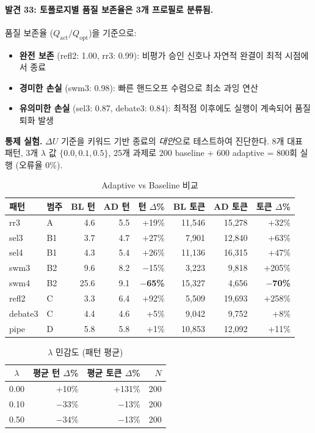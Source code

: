 \documentclass[a4paper,11pt]{article}
\begin{document}
\paragraph{발견 33: 토폴로지별 품질 보존율은 3개 프로필로 분류됨.}
품질 보존율 ($Q_{\text{act}}/Q_{\text{opt}}$)을 기준으로:
\begin{itemize}
  \item \textbf{완전 보존} (refl2: 1.00, rr3: 0.99): 비평가 승인 신호나 자연적 완결이 최적 시점에서 종료
  \item \textbf{경미한 손실} (swm3: 0.98): 빠른 핸드오프 수렴으로 최소 과잉 연산
  \item \textbf{유의미한 손실} (sel3: 0.87, debate3: 0.84): 최적점 이후에도 실행이 계속되어 품질 퇴화 발생
\end{itemize}

\textbf{통제 실험.} $\Delta U$ 기준을 키워드 기반 종료의 \emph{대안}으로 테스트하여 진단한다. 8개 대표 패턴, 3개 $\lambda$ 값 $\{0.0, 0.1, 0.5\}$, 25개 과제로 200 baseline + 600 adaptive = 800회 실행 (오류율 0\%).

\begin{table}[H]
\centering
\caption{Adaptive vs Baseline 비교}
\label{tab:adaptive-vs-baseline}
{\small
\begin{tabular}{llrrrrrr}
\toprule
패턴 & 범주 & BL 턴 & AD 턴 & 턴 $\Delta$\% & BL 토큰 & AD 토큰 & 토큰 $\Delta$\% \\
\midrule
rr3     & A  & 4.6  & 5.5  & +19\%  & 11,546  & 15,278  & +32\% \\
sel3    & B1 & 3.7  & 4.7  & +27\%  & 7,901   & 12,840  & +63\% \\
sel4    & B1 & 4.3  & 5.4  & +26\%  & 11,136  & 16,315  & +47\% \\
swm3    & B2 & 9.6  & 8.2  & $-$15\% & 3,223  & 9,818   & +205\% \\
swm4    & B2 & 25.6 & 9.1  & \textbf{$-$65\%} & 15,327 & 4,656 & \textbf{$-$70\%} \\
refl2   & C  & 3.3  & 6.4  & +92\%  & 5,509   & 19,693  & +258\% \\
debate3 & C  & 4.4  & 4.6  & +5\%   & 9,042   & 9,752   & +8\% \\
pipe    & D  & 5.8  & 5.8  & +1\%   & 10,853  & 12,092  & +11\% \\
\bottomrule
\end{tabular}
}
\end{table}

\begin{table}[H]
\centering
\caption{$\lambda$ 민감도 (패턴 평균)}
\label{tab:lambda-pattern-avg}
{\small
\begin{tabular}{crrr}
\toprule
$\lambda$ & 평균 턴 $\Delta$\% & 평균 토큰 $\Delta$\% & $N$ \\
\midrule
0.00 & +10\%  & +131\% & 200 \\
0.10 & $-$33\% & $-$13\% & 200 \\
0.50 & $-$34\% & $-$13\% & 200 \\
\bottomrule
\end{tabular}
}
\end{table}
\end{document}
